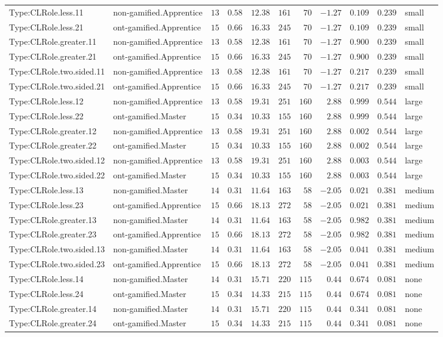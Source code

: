 \documentclass[6pt,a4paper]{article}
\begin{document}
{\begin{longtable}{llrrrrrrrrl}
Type:CLRole.less.11&non-gamified.Apprentice&$13$&$0.58$&$12.38$&$161$&$ 70$&$-1.27$&$0.109$&$0.239$&small\tabularnewline
Type:CLRole.less.21&ont-gamified.Apprentice&$15$&$0.66$&$16.33$&$245$&$ 70$&$-1.27$&$0.109$&$0.239$&small\tabularnewline
Type:CLRole.greater.11&non-gamified.Apprentice&$13$&$0.58$&$12.38$&$161$&$ 70$&$-1.27$&$0.900$&$0.239$&small\tabularnewline
Type:CLRole.greater.21&ont-gamified.Apprentice&$15$&$0.66$&$16.33$&$245$&$ 70$&$-1.27$&$0.900$&$0.239$&small\tabularnewline
Type:CLRole.two.sided.11&non-gamified.Apprentice&$13$&$0.58$&$12.38$&$161$&$ 70$&$-1.27$&$0.217$&$0.239$&small\tabularnewline
Type:CLRole.two.sided.21&ont-gamified.Apprentice&$15$&$0.66$&$16.33$&$245$&$ 70$&$-1.27$&$0.217$&$0.239$&small\tabularnewline
Type:CLRole.less.12&non-gamified.Apprentice&$13$&$0.58$&$19.31$&$251$&$160$&$ 2.88$&$0.999$&$0.544$&large\tabularnewline
Type:CLRole.less.22&ont-gamified.Master&$15$&$0.34$&$10.33$&$155$&$160$&$ 2.88$&$0.999$&$0.544$&large\tabularnewline
Type:CLRole.greater.12&non-gamified.Apprentice&$13$&$0.58$&$19.31$&$251$&$160$&$ 2.88$&$0.002$&$0.544$&large\tabularnewline
Type:CLRole.greater.22&ont-gamified.Master&$15$&$0.34$&$10.33$&$155$&$160$&$ 2.88$&$0.002$&$0.544$&large\tabularnewline
Type:CLRole.two.sided.12&non-gamified.Apprentice&$13$&$0.58$&$19.31$&$251$&$160$&$ 2.88$&$0.003$&$0.544$&large\tabularnewline
Type:CLRole.two.sided.22&ont-gamified.Master&$15$&$0.34$&$10.33$&$155$&$160$&$ 2.88$&$0.003$&$0.544$&large\tabularnewline
Type:CLRole.less.13&non-gamified.Master&$14$&$0.31$&$11.64$&$163$&$ 58$&$-2.05$&$0.021$&$0.381$&medium\tabularnewline
Type:CLRole.less.23&ont-gamified.Apprentice&$15$&$0.66$&$18.13$&$272$&$ 58$&$-2.05$&$0.021$&$0.381$&medium\tabularnewline
Type:CLRole.greater.13&non-gamified.Master&$14$&$0.31$&$11.64$&$163$&$ 58$&$-2.05$&$0.982$&$0.381$&medium\tabularnewline
Type:CLRole.greater.23&ont-gamified.Apprentice&$15$&$0.66$&$18.13$&$272$&$ 58$&$-2.05$&$0.982$&$0.381$&medium\tabularnewline
Type:CLRole.two.sided.13&non-gamified.Master&$14$&$0.31$&$11.64$&$163$&$ 58$&$-2.05$&$0.041$&$0.381$&medium\tabularnewline
Type:CLRole.two.sided.23&ont-gamified.Apprentice&$15$&$0.66$&$18.13$&$272$&$ 58$&$-2.05$&$0.041$&$0.381$&medium\tabularnewline
Type:CLRole.less.14&non-gamified.Master&$14$&$0.31$&$15.71$&$220$&$115$&$ 0.44$&$0.674$&$0.081$&none\tabularnewline
Type:CLRole.less.24&ont-gamified.Master&$15$&$0.34$&$14.33$&$215$&$115$&$ 0.44$&$0.674$&$0.081$&none\tabularnewline
Type:CLRole.greater.14&non-gamified.Master&$14$&$0.31$&$15.71$&$220$&$115$&$ 0.44$&$0.341$&$0.081$&none\tabularnewline
Type:CLRole.greater.24&ont-gamified.Master&$15$&$0.34$&$14.33$&$215$&$115$&$ 0.44$&$0.341$&$0.081$&none\tabularnewline

\end{longtable}}
\end{document}

